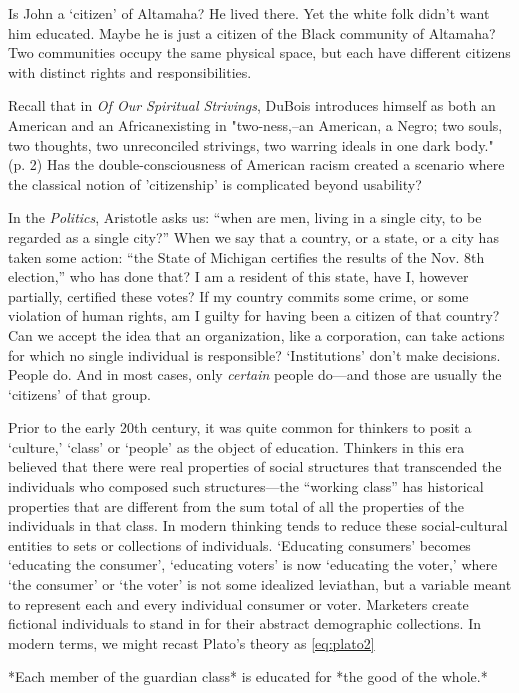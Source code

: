 Is John a `citizen' of Altamaha? He lived there. Yet the white folk didn't want him educated. Maybe he is just a citizen of the Black community of Altamaha? Two communities occupy the same physical space, but each have different citizens with distinct rights and responsibilities. \begin{question}Recall that in \emph{Of Our Spiritual Strivings}, DuBois introduces himself as both an American and an African\textemdash existing in "two-ness,--an American, a Negro; two souls, two thoughts, two unreconciled strivings, two warring ideals in one dark body." (p. 2) Has the double-consciousness of American racism created a scenario where the classical notion of 'citizenship' is complicated beyond usability? \end{question}

In the \emph{Politics}, Aristotle asks us: ``when are men, living in a single city, to be regarded as a single city?'' When we say that a country, or a state, or a city has taken some action: ``the State of Michigan certifies the results of the Nov. 8th election,'' who has done that? I am a resident of this state, have I, however partially, certified these votes? If my country commits some crime, or some violation of human rights, am I guilty for having been a citizen of that country? Can we accept the idea that an organization, like a corporation, can take actions for which no single individual is responsible? `Institutions' don't make decisions. People do. And in most cases, only \emph{certain} people do---and those are usually the `citizens' of that group.

Prior to the early 20th century, it was quite common for thinkers to posit a `culture,' `class' or `people' as the object of education. Thinkers in this era believed that there were real properties of social structures that transcended the individuals who composed such structures---the ``working class'' has historical properties that are different from the sum total of all the properties of the individuals in that class. In modern thinking tends to reduce these social-cultural entities to sets or collections of individuals. `Educating consumers' becomes `educating the consumer', `educating voters' is now `educating the voter,' where `the consumer' or `the voter' is not some idealized leviathan, but a variable meant to represent each and every individual consumer or voter. Marketers create fictional individuals to stand in for their abstract demographic collections. In modern terms, we might recast Plato's theory as \ref{eq:plato2}\begin{purpose}*Each member of the guardian class* is educated for *the good of the whole.*\label{eq:plato2}\end{purpose}

